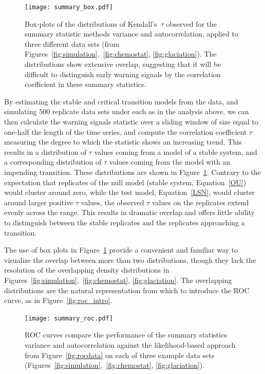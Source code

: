 \documentclass[authoryear,review,11pt]{elsarticle}
\begin{document}
 \begin{figure}
   \begin{center}
     \texttt{[image: summary\_box.pdf]}
     \caption{Box-plots of the distributions of Kendall's~$\tau$ observed for the summary statistic methods variance and autocorrelation, applied to three different data sets (from Figures~\ref{fig:simulation},~\ref{fig:chemostat}, \ref{fig:glaciation}).  The distributions show extensive overlap, suggesting that it will be difficult to distinguish early warning signals by the correlation coefficient in these summary statistics.}
     \label{fig:summary_box}
  \end{center}
 \end{figure}



By estimating the stable and critical transition models from the data,
and simulating 500 replicate data sets under each as in the analysis above,
we can then calculate the warning signals statistic over a sliding window
of size equal to one-half the length of the time series,
and compute the correlation coefficient $\tau$ measuring the degree to which the statistic shows an increasing trend.
This results in a distribution of $\tau$ values coming from a model of a stable system,
and a corresponding distribution of $\tau$ values coming from the model with an impending transition.
These distributions are shown in Figure~\ref{fig:summary_box}.
Contrary to the expectation that replicates of the null model (stable system, Equation~\eqref{OU}) would cluster around zero, 
while the test model, Equation~\eqref{LSN}, would cluster around larger positive $\tau$ values, 
the observed $\tau$ values on the replicates extend evenly across the range.  
This results in dramatic overlap and offers little ability to distinguish between the stable replicates 
and the replicates approaching a transition. 

The use of box plots in Figure~\ref{fig:summary_box} provide a convenient and familiar way 
to visualize the overlap between more than two distributions,
though they lack the resolution of the overlapping density distributions in 
Figures~\ref{fig:simulation},~\ref{fig:chemostat}, \ref{fig:glaciation}.  
The overlapping distributions are the natural representation from which to introduce the ROC curve, as in Figure~\ref{fig:roc_intro}.  




 \begin{figure}
   \begin{center}
     \texttt{[image: summary\_roc.pdf]}
     \caption{ROC curves compare the performance of the summary statistics variance and autocorrelation against the likelihood-based approach from Figure~\ref{fig:rocdata} on each of three example data sets (Figures~\ref{fig:simulation},~\ref{fig:chemostat}, \ref{fig:glaciation}).}
     \label{fig:summary_roc}
  \end{center}
 \end{figure}
\end{document}
